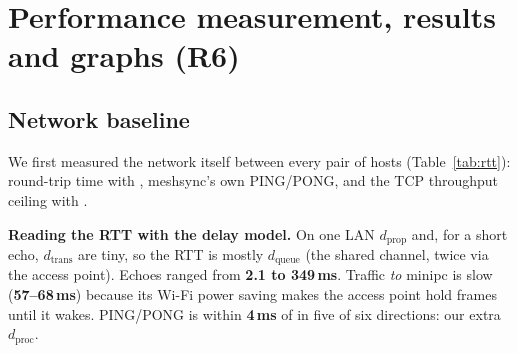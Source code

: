 \newpage
\section{Performance measurement, results and graphs (R6)}
\label{sec:performance}

\subsection{Network baseline}
\label{sec:baseline}

We first measured the network itself between every pair of hosts (Table~\ref{tab:rtt}): round-trip
time with , meshsync's own PING/PONG, and the TCP throughput ceiling with .

\textbf{Reading the RTT with the delay model.} On one LAN $d_\mathrm{prop}$ and, for a short echo,
$d_\mathrm{trans}$ are tiny, so the RTT is mostly $d_\mathrm{queue}$ (the shared channel, twice via the
access point). Echoes ranged from \textbf{2.1 to 349\,ms}. Traffic \emph{to} minipc
is slow (\textbf{57--68\,ms}) because its Wi-Fi power saving makes the access point hold frames until it
wakes. PING/PONG is within \textbf{4\,ms} of  in five of six directions: our extra $d_\mathrm{proc}$.


